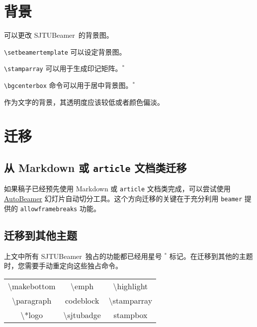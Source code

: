 \documentclass[
    UTF8,
    heading=true,
    12pt,
    a4paper
]{ctexrep}
\def\themename{\textsf{SJTUBeamer}}
\begin{document}
\chapter{背景}

可以更改 \themename\ 的背景图。


\begin{commentlist}
  \item \texttt{\textbackslash{}setbeamertemplate} 可以设定背景图。
  \item \texttt{\textbackslash{}stamparray} 可以用于生成印记矩阵。$^*$
  \item \texttt{\textbackslash{}bgcenterbox} 命令可以用于居中背景图。$^*$
  \item 作为文字的背景，其透明度应该较低或者颜色偏淡。
\end{commentlist}


\chapter{迁移}

\section{从 Markdown 或 \texttt{article} 文档类迁移}

如果稿子已经预先使用 Markdown 或 \texttt{article} 文档类完成，可以尝试使用 \href{https://logcreative.github.io/AutoBeamer/}{AutoBeamer} 幻灯片自动切分工具。这个方向迁移的关键在于充分利用 \texttt{beamer} 提供的 \texttt{allowframebreaks} 功能。

\section{迁移到其他主题}

上文中所有 \themename\ 独占的功能都已经用星号 $^*$ 标记。在迁移到其他的主题时，您需要手动重定向这些独占命令。

\begin{table}[h]
  \centering
  \begin{tabular}{>{\ttfamily}c>{\ttfamily}c>{\ttfamily}c}
    \hline
    \textbackslash{}makebottom & \textbackslash{}emph      & \textbackslash{}highlight  \\
    \textbackslash{}paragraph  & codeblock                 & \textbackslash{}stamparray \\
    \textbackslash{}*logo      & \textbackslash{}sjtubadge & stampbox                   \\
    \hline
  \end{tabular}
\end{table}
\end{document}
